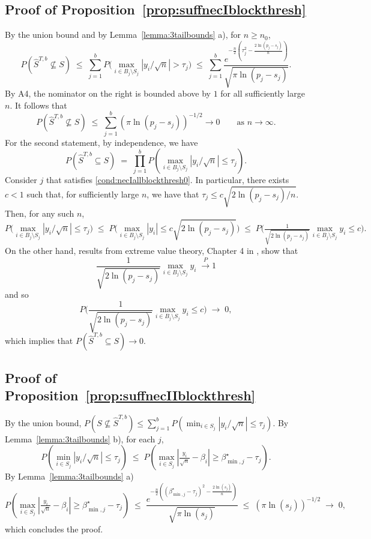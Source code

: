 \documentclass[aos]{imsart}
\theoremstyle{plain}
\begin{document}
\begin{supplement}
\subsection{Proof of Proposition~\ref{prop:suffnecIblockthresh}} By the union bound and by Lemma~\ref{lemma:3tailbounds} a), for $n\geq n_0$, \begin{equation*}
P\left(\hat{S}^{T,b} \not\subseteq S\right)\;\leq\; \sum_{j=1}^b P\Big(\max_{i\in B_j\setminus S_j}|y_i/\sqrt{n}|>\tau_{j}\Big)\;\leq\;\sum_{j=1}^b\frac{e^{-\tfrac{n}{2}\left(\tau_j^2-\tfrac{2\ln(p_j-s_j)}{n}\right)}}{\sqrt{\pi\ln(p_j-s_j)}} 	.
 \end{equation*}
 By A4, the nominator on the right is bounded above by $1$ for all sufficiently large $n$. It follows that 
	$$P\left(\hat{S}^{T,b} \not\subseteq S\right) \;\leq\; \sum_{j=1}^b (\pi\ln (p_j-s_j))^{-1/2} \to 0\qquad \mbox{as } n\to \infty.$$
For the second statement, by independence, we have 
$$P(\hat{S}^{T,b} \subseteq S)\;=\;\prod_{j=1}^b P(\max_{i \in B_j\setminus S_j}|y_i/\sqrt{n}| \leq \tau_j).$$ 
Consider $j$ that satisfies \eqref{cond:necIallblockthresh0}. In particular, there exists $c<1$ such that, for sufficiently large $n$, we have that $\tau_j\leq c\sqrt{2\ln(p_j-s_j)/n}$. Then, for any such $n$,
$$
P\Big(\max_{i \in B_j\setminus S_j}|y_i/\sqrt{n}| \leq \tau_j\Big)\;\leq\; P\Big(\max_{i \in B_j\setminus S_j}|y_i| \leq c \sqrt{2\ln(p_j-s_j)}\Big)\;\leq\;P\Big(\tfrac{1}{\sqrt{2\ln(p_j-s_j)}}\max_{i \in B_j\setminus S_j}y_i \leq c \Big).
$$
On the other hand, results from extreme value theory, Chapter 4 in \cite{galambos}, show that 
 $$\frac{1}{\sqrt{2 \ln(p_j-s_j)}}\max_{i\in B_j\setminus S_j}y_i \;\overset{P}{\longrightarrow} 1$$
 and so 
 $$
 P\Big(\frac{1}{\sqrt{2\ln(p_j-s_j)}}\max_{i \in B_j\setminus S_j}y_i \leq c \Big)\;\to\;0,
 $$ 
 which implies that $P(\hat{S}^{T,b} \subseteq S)\to 0$. 

\subsection{Proof of Proposition~\ref{prop:suffnecIIblockthresh}}
	 By the union bound, 
	$P\left(S \not\subseteq \hat{S}^{T,b}\right)\leq \sum_{j=1}^b  P\left(\min_{i\in S_j}|y_i/\sqrt{n}|\leq\tau_j\right)$. 
	By Lemma~\ref{lemma:3tailbounds} b), for each $j$,	
	$$P\left(\min_{i\in S_j}|y_i/\sqrt{n}|\leq\tau_j\right)\;\leq\; P\left(\max_{i\in S_j}|\tfrac{y_i}{\sqrt{n}}-\beta_i| \geq\beta_{\min,j}^{\star}-\tau_j \right).$$ By Lemma~\ref{lemma:3tailbounds} a)  
	\begin{equation}\label{eq:rate2}
P\left(\max_{i\in S_j}|\tfrac{y_i}{\sqrt{n}}-\beta_i| \geq\beta_{\min,j}^{\star}-\tau_j \right) \;\leq\;\frac{e^{-\tfrac{n}{2}\left((\beta^\star_{\min,j}-\tau_j)^2-\tfrac{2\ln(s_j)}{n}\right)}}{\sqrt{\pi\ln(s_j)}}\;\leq\; (\pi\ln (s_j))^{-1/2}\;\to\;0,		
	\end{equation}
	which concludes the proof. 


\end{supplement}
\end{document}
